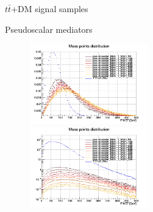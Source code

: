 \documentclass[8pt]{beamer}
\begin{document}
\begin{frame}{$t \bar t$+DM signal samples}
\vspace{-5pt}
\begin{block}{\centering Pseudoscalar mediators}\end{block} \vspace{-10pt}
\begin{figure}[htbp]
\centering
\begin{minipage}[b]{.49\textwidth}
\begin{center}
\includegraphics[width=5.2cm, height=3.5cm]{figs/pseudoscalarMETmChi1Norm.png}
\end{center}
\end{minipage}\hfill
\begin{minipage}[b]{.49\textwidth}
\begin{center}
\includegraphics[width=5.2cm, height=3.5cm]{figs/pseudoscalarMETmChi1.png}
\end{center}
\end{minipage} \hfill
\end{figure} \vfill
\end{frame}
\end{document}
